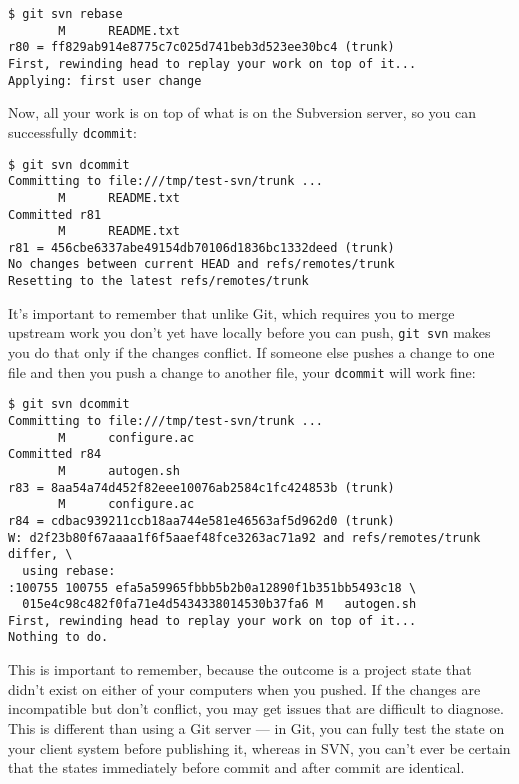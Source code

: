 \documentclass[a4paper]{book}
\begin{document}
\begin{shaded}\begin{verbatim}
$ git svn rebase
       M      README.txt
r80 = ff829ab914e8775c7c025d741beb3d523ee30bc4 (trunk)
First, rewinding head to replay your work on top of it...
Applying: first user change
\end{verbatim}\end{shaded}

Now, all your work is on top of what is on the Subversion server, so you can successfully \texttt{dcommit}:

\begin{shaded}\begin{verbatim}
$ git svn dcommit
Committing to file:///tmp/test-svn/trunk ...
       M      README.txt
Committed r81
       M      README.txt
r81 = 456cbe6337abe49154db70106d1836bc1332deed (trunk)
No changes between current HEAD and refs/remotes/trunk
Resetting to the latest refs/remotes/trunk
\end{verbatim}\end{shaded}

It's important to remember that unlike Git, which requires you to merge upstream work you don't yet have locally before you can push, \texttt{git svn} makes you do that only if the changes conflict. If someone else pushes a change to one file and then you push a change to another file, your \texttt{dcommit} will work fine:

\begin{shaded}\begin{verbatim}
$ git svn dcommit
Committing to file:///tmp/test-svn/trunk ...
       M      configure.ac
Committed r84
       M      autogen.sh
r83 = 8aa54a74d452f82eee10076ab2584c1fc424853b (trunk)
       M      configure.ac
r84 = cdbac939211ccb18aa744e581e46563af5d962d0 (trunk)
W: d2f23b80f67aaaa1f6f5aaef48fce3263ac71a92 and refs/remotes/trunk differ, \
  using rebase:
:100755 100755 efa5a59965fbbb5b2b0a12890f1b351bb5493c18 \
  015e4c98c482f0fa71e4d5434338014530b37fa6 M   autogen.sh
First, rewinding head to replay your work on top of it...
Nothing to do.
\end{verbatim}\end{shaded}

This is important to remember, because the outcome is a project state that didn't exist on either of your computers when you pushed. If the changes are incompatible but don't conflict, you may get issues that are difficult to diagnose. This is different than using a Git server --- in Git, you can fully test the state on your client system before publishing it, whereas in SVN, you can't ever be certain that the states immediately before commit and after commit are identical.
\end{document}
